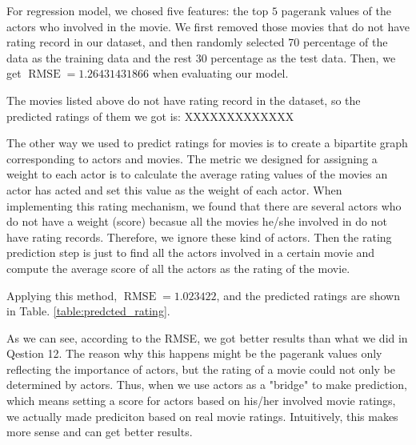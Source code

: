 \documentclass[11pt]{article}
\DeclareMathOperator{\RMSE}{RMSE}
\begin{document}
For regression model, we chosed five features: the top $5$ pagerank values of the actors who involved in the movie. We first removed those movies that do not have rating record in our dataset, and then randomly selected 70 percentage of the data as the training data and the rest 30 percentage as the test data. Then, we get $\RMSE = 1.26431431866$  when evaluating our model.

The movies listed above do not have rating record in the dataset, so the predicted ratings of them we got is: XXXXXXXXXXXXX

The other way we used to predict ratings for movies is to create a bipartite graph corresponding to actors and movies. The metric we designed for assigning a weight to each actor is to calculate the average rating values of the movies an actor has acted and set this value as the weight of each actor. When implementing this rating mechanism, we found that there are several actors who do not have a weight (score) becasue all the movies he/she involved in do not have rating records. Therefore, we ignore these kind of actors. Then the rating prediction step is just to find all the actors involved in a certain movie and compute the average score of all the actors as the rating of the movie.

Applying this method, $\RMSE=1.023422$, and the predicted ratings are shown in Table. \ref{table:predcted_rating}.

As we can see, according to the RMSE, we got better results than what we did in Qestion 12. The reason why this happens might be the pagerank values only reflecting the importance of actors, but the rating of a movie could not only be determined by actors. Thus, when we use actors as a "bridge" to make prediction, which means setting a score for actors based on his/her involved movie ratings, we actually made prediciton based on real movie ratings. Intuitively, this makes more sense and can get better results.

\begin{table}[H]
\center
\caption{Average rating vs. actual rating of the three movies, with community considered}
\label{table:predcted_rating}
\end{table}
\end{document}
